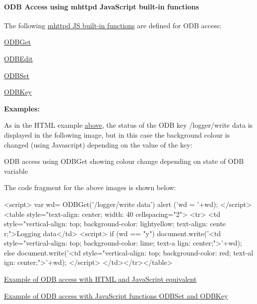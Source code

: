 \par
\hypertarget{RC_mhttpd_custom_ODB_access_RC_mhttpd_custom_odb_js}{}\paragraph{ODB Access using mhttpd JavaScript built-\/in functions}\label{RC_mhttpd_custom_ODB_access_RC_mhttpd_custom_odb_js}
The following \hyperlink{RC_mhttpd_custom_js_lib}{mhttpd JS built-\/in functions} are defined for ODB access:
\begin{DoxyItemize}
\item \hyperlink{RC_mhttpd_custom_ODB_access_RC_mhttpd_custom_odbget}{ODBGet}
\item \hyperlink{RC_mhttpd_custom_ODB_access_RC_mhttpd_custom_odbedit}{ODBEdit}
\item \hyperlink{RC_mhttpd_custom_ODB_access_RC_mhttpd_custom_odbset}{ODBSet}
\item \hyperlink{RC_mhttpd_custom_ODB_access_RC_mhttpd_custom_odbkey}{ODBKey}
\end{DoxyItemize}

{\bfseries Examples:} 
\begin{DoxyEnumerate}
\item As in the HTML example \hyperlink{RC_mhttpd_custom_ODB_access_odb_tag_ex1}{above}, the status of the ODB key /logger/write data is displayed in the following image, but in this case the background colour is changed (using Javascript) depending on the value of the key:

\begin{center} ODB access using ODBGet showing colour change depending on state of ODB variable  \par
  \end{center}  \par
 The code fragment for the above images is shown below: 
\begin{DoxyCode}
<script>
var wd= ODBGet('/logger/write data')
alert ('wd = '+wd);
</script>
<table style="text-align: center; width: 40%
cellspacing="2">
<tr>
<td style="vertical-align: top; background-color:  lightyellow; text-align: cente
      r;">Logging data</td>
<script>
if (wd == "y")
   document.write('<td style="vertical-align: top; background-color: lime; text-a
      lign: center;">'+wd);
else
   document.write('<td style="vertical-align: top; background-color: red; text-al
      ign: center;">'+wd);
</script>
</td></tr></table>
\end{DoxyCode}



\item \hyperlink{RC_mhttpd_custom_ODB_access_examples_RC_mhttpd_js_example1}{Example of ODB access with HTML and JavaScript equivalent} 
\item \hyperlink{RC_mhttpd_custom_ODB_access_examples_RC_mhttpd_js_example2}{Example of ODB access with JavaScript functions ODBSet and ODBKey} 
\end{DoxyEnumerate}

